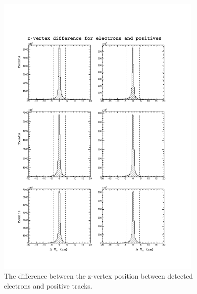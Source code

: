 \begin{figure}
  \label{fig:dvz}
  \begin{center}
    \includegraphics[width=10cm]{image/plots/hadron-id/dvz.pdf}
    \caption{The difference between the z-vertex position between detected electrons and positive tracks.}
  \end{center}
\end{figure}



%


